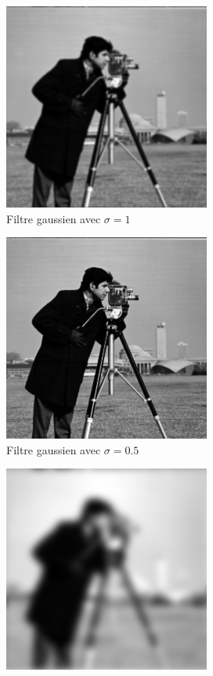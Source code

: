 \documentclass{article}
\begin{document}
\begin{figure}[H]
    \centering
    \begin{subfigure}[b]{0.45\linewidth}
        \centering
        \includegraphics[scale = 0.5]{TpIFT6150-2-filtre-gaussien_1.png}
        \caption{Filtre gaussien avec $\sigma = 1$}
    \end{subfigure}
    \begin{subfigure}[b]{0.45\linewidth}
        \centering
        \includegraphics[scale = 0.5]{TpIFT6150-2-filtre-gaussien_05.png}
        \caption{Filtre gaussien avec $\sigma = 0.5$}
    \end{subfigure}
    \vspace{1em}
    \begin{subfigure}[b]{0.45\linewidth}
        \centering
        \includegraphics[scale = 0.5]{TpIFT6150-2-filtre-gaussien_5.png}

\end{subfigure}
\end{figure}
\end{document}
